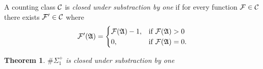 \documentclass[12pt]{article}
\def\A{{\frak A}}
\def\C{{\cal C}}
\def\F{{\cal F}}
\newtheorem{theo}{Theorem}
\begin{document}
A counting class $\C$ is {\em closed under substraction by one} if for every function $\F \in \C$ there exists $\F' \in \C$ where 
\begin{eqnarray*}
\F'(\A) =
\begin{cases}
\F(\A)-1, & \text{if }\F(\A) > 0 \\
0, & \text{if }\F(\A) = 0.
\end{cases}
\end{eqnarray*}
\begin{theo}
$\#\Sigma_1^+$ is closed under substraction by one
\end{theo}
\end{document}
